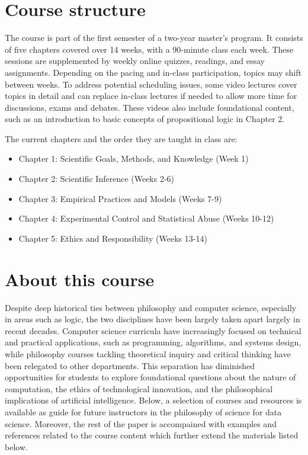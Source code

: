 \documentclass[
  12pt,
]{book}
\providecommand{\tightlist}{%
  \setlength{\itemsep}{0pt}\setlength{\parskip}{0pt}}
\begin{document}
\section*{Course structure}\label{course-structure}

The course is part of the first semester of a two-year master's program. It consists of five chapters covered over 14 weeks, with a 90-minute class each week. These sessions are supplemented by weekly online quizzes, readings, and essay assignments. Depending on the pacing and in-class participation, topics may shift between weeks. To address potential scheduling issues, some video lectures cover topics in detail and can replace in-class lectures if needed to allow more time for discussions, exams and debates. These videos also include foundational content, such as an introduction to basic concepts of propositional logic in Chapter 2.

The current chapters and the order they are taught in class are:

\begin{itemize}
\tightlist
\item
  Chapter 1: Scientific Goals, Methods, and Knowledge (Week 1)
\item
  Chapter 2: Scientific Inference (Weeks 2-6)
\item
  Chapter 3: Empirical Practices and Models (Weeks 7-9)
\item
  Chapter 4: Experimental Control and Statistical Abuse (Weeks 10-12)
\item
  Chapter 5: Ethics and Responsibility (Weeks 13-14)
\end{itemize}

\section*{About this course}\label{about-this-course}

Despite deep historical ties between philosophy and computer science, especially in areas such as logic, the two disciplines have been largely taken apart largely in recent decades. Computer science curricula have increasingly focused on technical and practical applications, such as programming, algorithms, and systems design, while philosophy courses tackling theoretical inquiry and critical thinking have been relegated to other departments. This separation has diminished opportunities for students to explore foundational questions about the nature of computation, the ethics of technological innovation, and the philosophical implications of artificial intelligence. Below, a selection of courses and resources is available as guide for future instructors in the philosophy of science for data science. Moreover, the rest of the paper is accompained with examples and references related to the course content which further extend the materials listed below.
\end{document}
